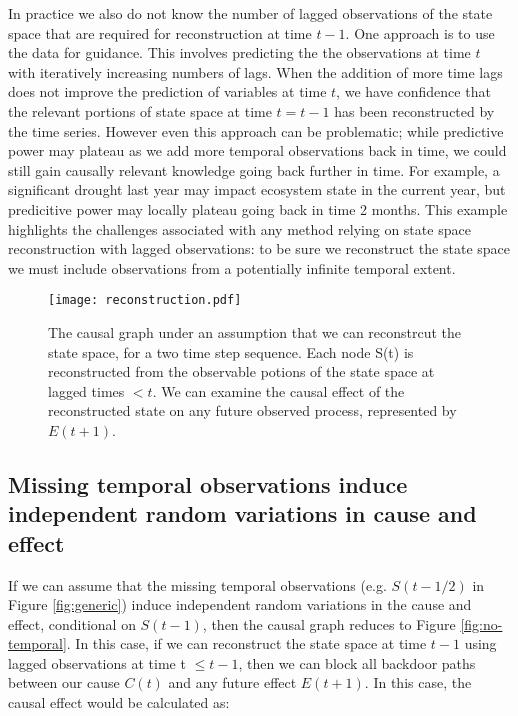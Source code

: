 \documentclass[12pt]{article}
\begin{document}
In practice we also do not know the number of lagged observations of
the state space that are required for reconstruction at time
$t-1$. One approach is to use the data for guidance. This involves
predicting the the observations at time $t$ with iteratively
increasing numbers of lags. When the addition of more time lags does
not improve the prediction of variables at time $t$, we have
confidence that the relevant portions of state space at time $t=t-1$
has been reconstructed by the time series. However even this approach
can be problematic; while predictive power may plateau as we add more
temporal observations back in time, we could still gain causally
relevant knowledge going back further in time. For example, a
significant drought last year may impact ecosystem state in the
current year, but predicitive power may locally plateau going back in
time 2 months. This example highlights the challenges associated with
any method relying on state space reconstruction with lagged
observations: to be sure we reconstruct the state space we must
include observations from a potentially infinite temporal extent.

\begin{figure}
  \texttt{[image: reconstruction.pdf]}
  \caption{The causal graph under an assumption that we can
    reconstrcut the state space, for a two time step sequence. Each
    node S(t) is reconstructed from the observable potions of the
    state space at lagged times $< t$. We can examine the causal
    effect of the reconstructed state on any future observed process,
    represented by $E(t+1)$.}
  \label{fig:reconstructed}
\end{figure}

\subsection{Missing temporal observations induce independent random
  variations in cause and effect}
\label{sec:miss-temp-observ}

If we can assume that the missing temporal observations
(e.g. $S(t-1/2)$ in Figure \ref{fig:generic}) induce independent
random variations in the cause and effect, conditional on $S(t-1)$,
then the causal graph reduces to Figure \ref{fig:no-temporal}. In this
case, if we can reconstruct the state space at time $t-1$ using lagged
observations at time t $\leq t-1$, then we can block all backdoor
paths between our cause $C(t)$ and any future effect $E(t+1)$. In this
case, the causal effect would be calculated as:
\end{document}
